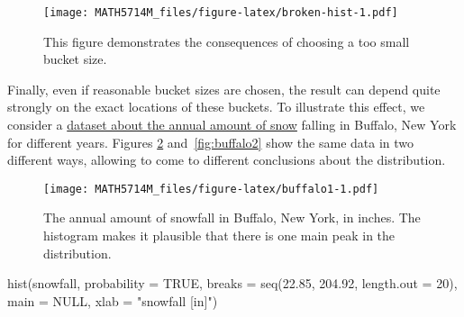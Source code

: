 \documentclass[
  a4paper,
]{article}
\newenvironment{Shaded}{\begin{snugshade}}{\end{snugshade}}
\newcommand{\AttributeTok}[1]{\textcolor[rgb]{0.77,0.63,0.00}{#1}}
\newcommand{\CommentTok}[1]{\textcolor[rgb]{0.56,0.35,0.01}{\textit{#1}}}
\newcommand{\ConstantTok}[1]{\textcolor[rgb]{0.00,0.00,0.00}{#1}}
\newcommand{\DecValTok}[1]{\textcolor[rgb]{0.00,0.00,0.81}{#1}}
\newcommand{\FloatTok}[1]{\textcolor[rgb]{0.00,0.00,0.81}{#1}}
\newcommand{\FunctionTok}[1]{\textcolor[rgb]{0.00,0.00,0.00}{#1}}
\newcommand{\NormalTok}[1]{#1}
\newcommand{\OtherTok}[1]{\textcolor[rgb]{0.56,0.35,0.01}{#1}}
\newcommand{\SpecialCharTok}[1]{\textcolor[rgb]{0.00,0.00,0.00}{#1}}
\newcommand{\StringTok}[1]{\textcolor[rgb]{0.31,0.60,0.02}{#1}}
\theoremstyle{definition}
\theoremstyle{definition}
\theoremstyle{definition}
\theoremstyle{definition}
\theoremstyle{remark}
\begin{document}
\begin{figure}
\centering
\texttt{[image: MATH5714M\_files/figure-latex/broken-hist-1.pdf]}
\caption{\label{fig:broken-hist}This figure demonstrates the consequences of choosing a too small bucket size.}
\end{figure}

Finally, even if reasonable bucket sizes are chosen, the result can
depend quite strongly on the exact locations of these buckets. To illustrate
this effect, we consider a
\href{https://www1.maths.leeds.ac.uk/~voss/data/buffalo/}{dataset about the annual amount of snow}
falling in Buffalo, New York for different years. Figures \ref{fig:buffalo1}
and~\ref{fig:buffalo2} show the same data in two different ways,
allowing to come to different conclusions about the distribution.



\begin{Shaded}
\end{Shaded}

\begin{figure}
\centering
\texttt{[image: MATH5714M\_files/figure-latex/buffalo1-1.pdf]}
\caption{\label{fig:buffalo1}The annual amount of snowfall in Buffalo, New York, in inches. The histogram makes it plausible that there is one main peak in the distribution.}
\end{figure}



\begin{Shaded}
\begin{Highlighting}[]
\FunctionTok{hist}\NormalTok{(snowfall, }\AttributeTok{probability =} \ConstantTok{TRUE}\NormalTok{,}
     \AttributeTok{breaks =} \FunctionTok{seq}\NormalTok{(}\FloatTok{22.85}\NormalTok{, }\FloatTok{204.92}\NormalTok{, }\AttributeTok{length.out =} \DecValTok{20}\NormalTok{),}
     \AttributeTok{main =} \ConstantTok{NULL}\NormalTok{, }\AttributeTok{xlab =} \StringTok{"snowfall [in]"}\NormalTok{)}
\end{Highlighting}
\end{Shaded}
\end{document}
